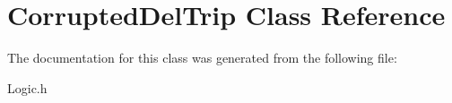 \hypertarget{class_corrupted_del_trip}{\section{Corrupted\+Del\+Trip Class Reference}
\label{class_corrupted_del_trip}
}


The documentation for this class was generated from the following file\+:\begin{DoxyCompactItemize}
\item 
Logic.\+h\end{DoxyCompactItemize}
